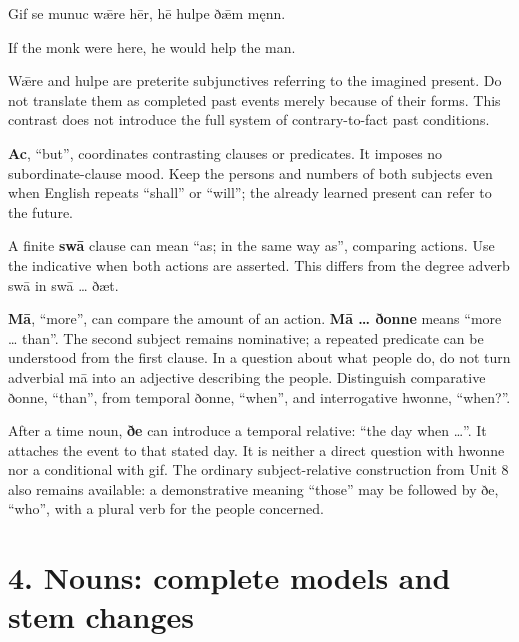 Gif se munuc wǣre hēr, hē hulpe ðǣm męnn.

If the monk were here, he would help the man.

Wǣre and hulpe are preterite subjunctives referring to the imagined present. Do not translate them as completed past events merely because of their forms. This contrast does not introduce the full system of contrary-to-fact past conditions.

\textbf{Ac}, “but”, coordinates contrasting clauses or predicates. It imposes no subordinate-clause mood. Keep the persons and numbers of both subjects even when English repeats “shall” or “will”; the already learned present can refer to the future.

A finite \textbf{swā} clause can mean “as; in the same way as”, comparing actions. Use the indicative when both actions are asserted. This differs from the degree adverb swā in swā … ðæt.

\textbf{Mā}, “more”, can compare the amount of an action. \textbf{Mā … ðonne} means “more … than”. The second subject remains nominative; a repeated predicate can be understood from the first clause. In a question about what people do, do not turn adverbial mā into an adjective describing the people. Distinguish comparative ðonne, “than”, from temporal ðonne, “when”, and interrogative hwonne, “when?”.

After a time noun, \textbf{ðe} can introduce a temporal relative: “the day when …”. It attaches the event to that stated day. It is neither a direct question with hwonne nor a conditional with gif. The ordinary subject-relative construction from Unit 8 also remains available: a demonstrative meaning “those” may be followed by ðe, “who”, with a plural verb for the people concerned.

\section*{4. Nouns: complete models and stem changes}

